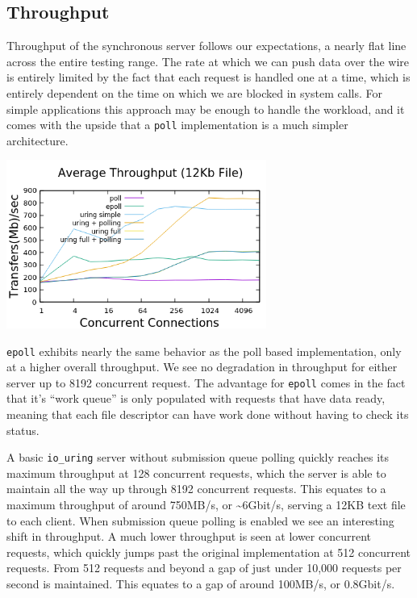 \documentclass[conference]{IEEEtran}{article}
\begin{document}
\subsection{Throughput}
\label{sec:org0970add}
Throughput of the synchronous server follows our expectations, a nearly flat line across the entire testing range. The rate at which we can push data over the wire is entirely limited by the fact that each request is handled one at a time, which is entirely dependent on the time on which we are blocked in system calls. For simple applications this approach may be enough to handle the workload, and it comes with the upside that a \texttt{poll} implementation is a much simpler architecture.

\begin{center}
\includegraphics[width=3.35in]{med_throughput.png}
\end{center}

\texttt{epoll} exhibits nearly the same behavior as the poll based implementation, only at a higher overall throughput. We see no degradation in throughput for either server up to 8192 concurrent request. The advantage for \texttt{epoll} comes in the fact that it's ``work queue'' is only populated with requests that have data ready, meaning that each file descriptor can have work done without having to check its status.

A basic \texttt{io\_uring} server without submission queue polling quickly reaches its maximum throughput at 128 concurrent requests, which the server is able to maintain all the way up through 8192 concurrent requests. This equates to a maximum throughput of around 750MB/s, or \textasciitilde{}6Gbit/s, serving a 12KB text file to each client. When submission queue polling is enabled we see an interesting shift in throughput. A much lower throughput is seen at lower concurrent requests, which quickly jumps past the original implementation at 512 concurrent requests. From 512 requests and beyond a gap of just under 10,000 requests per second is maintained. This equates to a gap of around 100MB/s, or 0.8Gbit/s.
\end{document}
